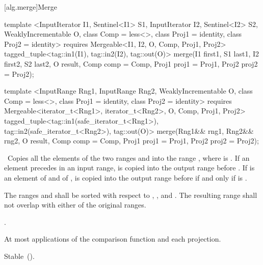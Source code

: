 [alg.merge]{Merge}

%
\begin{itemdecl}
template <InputIterator I1, Sentinel<I1> S1, InputIterator I2, Sentinel<I2> S2,
    WeaklyIncrementable O, class Comp = less<>, class Proj1 = identity,
    class Proj2 = identity>
  requires Mergeable<I1, I2, O, Comp, Proj1, Proj2>
  tagged_tuple<tag::in1(I1), tag::in2(I2), tag::out(O)>
    merge(I1 first1, S1 last1, I2 first2, S2 last2, O result,
          Comp comp = Comp{}, Proj1 proj1 = Proj1{}, Proj2 proj2 = Proj2{});

template <InputRange Rng1, InputRange Rng2, WeaklyIncrementable O, class Comp = less<>,
    class Proj1 = identity, class Proj2 = identity>
  requires Mergeable<iterator_t<Rng1>, iterator_t<Rng2>, O, Comp, Proj1, Proj2>
  tagged_tuple<tag::in1(safe_iterator_t<Rng1>),
               tag::in2(safe_iterator_t<Rng2>),
               tag::out(O)>
    merge(Rng1&& rng1, Rng2&& rng2, O result,
          Comp comp = Comp{}, Proj1 proj1 = Proj1{}, Proj2 proj2 = Proj2{});
\end{itemdecl}

\begin{itemdescr}
\pnum
\effects\ Copies all the elements of the two ranges  and
 into the range , where 
is .
If an element  precedes  in an input range,
 is copied into the output range before . If  is
an element of  and  of ,
 is copied into the output range before  if and only if
 is
.

\pnum
\requires The ranges  and  shall be
sorted with respect to , , and .
The resulting range shall not overlap with either of the original ranges.

\pnum
\returns
{}.

\pnum
\complexity
At most
applications of the comparison function and each projection.

\pnum
\remarks Stable~().
\end{itemdescr}

